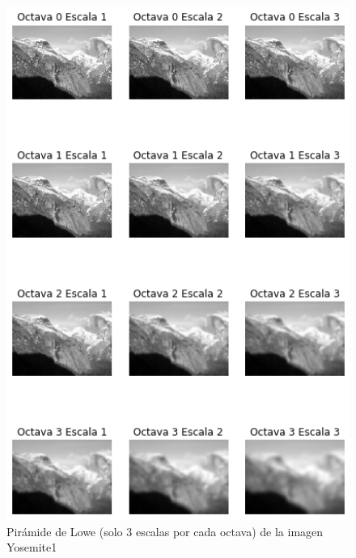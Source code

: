 \documentclass[12pt,spanish]{article}
\begin{document}
\begin{figure}[H]
	\centering
	\includegraphics[width=12cm]{./imagenes_memoria/octavas_escalas.png}
	\caption{Pirámide de Lowe (solo 3 escalas por cada octava) de la imagen Yosemite1}
	\label{octavas_escalas}
\end{figure}
\end{document}
